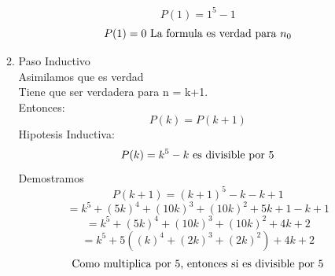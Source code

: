 \documentclass[10pt,a4paper]{article}
\begin{document}
\begin{itemize}
\begin{enumerate}
\begin{equation*}
						P(1) = 1^{5}-1
					\end{equation*}
					\begin{equation*}
						P(1) = 0 \textup{ La formula es verdad para } n_{0}
					\end{equation*}
				\item Paso Inductivo \\
					Asimilamos que es verdad\\
					Tiene que ser verdadera para n = k+1. \\
					Entonces:
					\begin{equation*}
						P(k) = P(k+1)
					\end{equation*}
					Hipotesis Inductiva:
					\begin{equation*}
						P(k) = k^{5}-k \textup{ es divisible por 5}
					\end{equation*}
					Demostramos
					\begin{equation*}
						P(k+1) = (k+1)^{5}-k - k +1
					\end{equation*}
					\begin{equation*}
						= k^{5}+(5k)^{4}+(10k)^{3}+(10k)^{2}+ 5k +1 - k +1
					\end{equation*}
					\begin{equation*}
						= k^{5}+(5k)^{4}+(10k)^{3}+(10k)^{2}+ 4k + 2
					\end{equation*}
					\begin{equation*}
						= k^{5}+5((k)^{4}+(2k)^{3}+(2k)^{2})+ 4k + 2
					\end{equation*}
					\begin{equation*}
						\textup{Como multiplica por 5, entonces si es divisible por 5}
					\end{equation*}
			\end{enumerate}
	\end{itemize}
	
\end{document}
